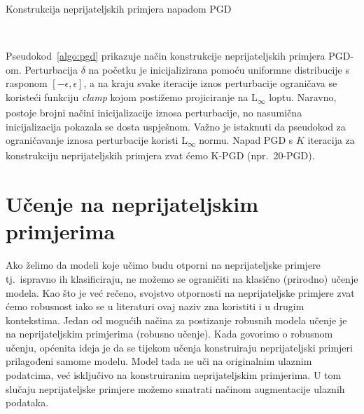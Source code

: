 \documentclass[times, utf8, zavrsni, numeric]{fer}
\begin{document}
\begin{algorithm}
    \caption{Konstrukcija neprijateljskih primjera napadom PGD}
    \label{algo:pgd}
    \begin{algorithmic}
        \\\hrulefill
        \ENDFOR
    \end{algorithmic}
\end{algorithm}

\pagebreak

Pseudokod~\ref{algo:pgd} prikazuje način konstrukcije neprijateljskih primjera PGD-om. 
Perturbacija $\delta$ na početku je inicijalizirana pomoću uniformne distribucije s rasponom $[-\epsilon, \epsilon]$, 
a na kraju svake iteracije iznos perturbacije ograničava se koristeći funkciju \textit{clamp} kojom postižemo projiciranje na L\textsubscript{$\infty$} loptu. 
Naravno, postoje brojni načini inicijalizacije iznosa perturbacije, no nasumična inicijalizacija pokazala se dosta uspješnom.
Važno je istaknuti da pseudokod za ograničavanje iznosa perturbacije koristi L\textsubscript{$\infty$} normu. 
Napad PGD s $K$ iteracija za konstrukciju neprijateljskih primjera zvat ćemo K-PGD (npr.\ 20-PGD).

\section{Učenje na neprijateljskim primjerima}

Ako želimo da modeli koje učimo budu otporni na neprijateljske primjere tj.\ ispravno ih klasificiraju, ne možemo se ograničiti na klasično (prirodno) učenje modela.
Kao što je već rečeno, svojstvo otpornosti na neprijateljske primjere zvat ćemo robusnost iako se u literaturi ovaj naziv zna koristiti i u drugim kontekstima.
Jedan od mogućih načina za postizanje robusnih modela učenje je na neprijateljskim primjerima (robusno učenje).
Kada govorimo o robusnom učenju, općenita ideja je da se tijekom učenja konstruiraju neprijateljski primjeri prilagođeni samome modelu.
Model tada ne uči na originalnim ulaznim podatcima, već isključivo na konstruiranim neprijateljskim primjerima.
U tom slučaju neprijateljske primjere možemo smatrati načinom augmentacije ulaznih podataka. %
\end{document}
